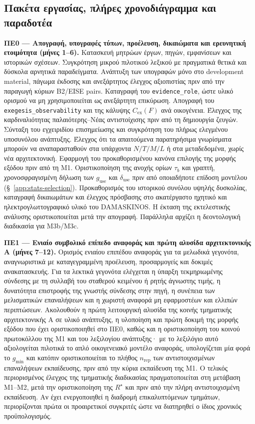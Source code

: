 \documentclass[11pt,a4paper]{article}
\begin{document}
\subsection{Πακέτα εργασίας, πλήρες χρονοδιάγραμμα και παραδοτέα}\label{app:impl-wp}

\textbf{ΠΕ0 --- Απογραφή, υπογραφές τύπων, προέλευση, δικαιώματα και ερευνητική ετοιμότητα (μήνες 1--6).} Κατασκευή μητρώων έργων, πηγών, εμφανίσεων και ιστορικών σχέσεων. Συγκρότηση μικρού πιλοτικού λεξικού με πραγματικά θετικά και δύσκολα αρνητικά παραδείγματα. Ανάπτυξη των υπογραφών μόνο στο development material, πάγωμα έκδοσης και ανεξάρτητος έλεγχος αξιοπιστίας πριν από την παραγωγή κύριων B2/EISE pairs. Καταγραφή του \texttt{evidence\_role}, ώστε υλικό ορισμού να μη χρησιμοποιείται ως ανεξάρτητη επικύρωση. Απογραφή του \texttt{exegesis\_observability} και της κάλυψης $C_{\mathrm{ex}}(F)$ ανά οικογένεια. Έλεγχος της καρδιναλιότητας παλαιότερης--Νέας αντιστοίχισης πριν από τη δημιουργία ζευγών. Σύνταξη του εγχειριδίου επισημείωσης και συγκρότηση του πλήρως ελεγμένου υποσυνόλου ανάπτυξης. Έλεγχος ότι τα απαιτούμενα παρατηρήσιμα γνωρίσματα μπορούν να αναπαρασταθούν στα υπάρχοντα $N/T/M/L$ ή στα μεταδεδομένα, χωρίς νέα αρχιτεκτονική. Εφαρμογή του προκαθορισμένου κανόνα επιλογής της μορφής εξόδου πριν από τη M1. Οριστικοποίηση της ανοχής ορίων $\tau_b$ και γραπτή, χρονοσφραγισμένη δήλωση των $g_{\mathrm{use}}$ και $\delta_{\mathrm{use}}$ πριν από οποιαδήποτε επίδοση μοντέλου (§~\ref{app:stats-selection}). Προκαθορισμός του ιστορικού συνόλου υψηλής δυσκολίας, καταγραφή δικαιωμάτων και έλεγχος πρόσβασης στο ακατέργαστο ηχητικό και ηλεκτρογλωττογραφικό υλικό του DAMASKINOS. Η έκταση της εκτελεστικής ανάλυσης οριστικοποιείται μετά την απογραφή. Παράλληλα αρχίζει η δεοντολογική διαδικασία για M3b/M3c.

\textbf{ΠΕ1 --- Ενιαίο συμβολικό επίπεδο αναφοράς και πρώτη αλυσίδα αρχιτεκτονικής A (μήνες 7--12).} Ορισμός ενιαίου επιπέδου αναφοράς για τα μελωδικά γεγονότα, αναγνωριστικά με καταγεγραμμένη προέλευση, προσαρμογείς και δοκιμές ανακατασκευής. Για τα λεκτικά γεγονότα ελέγχεται η ύπαρξη τεκμηριωμένης σύνδεσης με τη συλλαβή του σταθερού κειμένου ή ρητής άγνωστης τιμής, η δυνατότητα επιστροφής της γνωστής σύνδεσης στην πηγή, η συνέπεια των μελισματικών επαναλήψεων και η χωριστή αναφορά μη εφαρμοστέων και ελλιπών περιπτώσεων. Ακολουθούν η πρώτη λειτουργική αλυσίδα της κοινής τμηματικής αρχιτεκτονικής Α σε υλικό ανάπτυξης, η υλοποίηση και πρώτη δοκιμή της μορφής εξόδου που έχει οριστικοποιηθεί στο ΠΕ0, καθώς και η οριστικοποίηση του κοινού πρωτοκόλλου της M1 και του λεξιλογίου ανάπτυξης· με το λεξιλόγιο αυτό αξιολογείται πιλοτικά το απλό οικογενειακό μοντέλο αναφοράς, υπολογίζεται μία φορά το $g_{\min}$ και κατόπιν οριστικοποιείται το πλήθος $n_{\mathrm{rep}}$ των αντιστοιχισμένων επαναλήψεων εκπαίδευσης, πριν από την κύρια εκπαίδευση της M1. Ο τελικός περιορισμένος έλεγχος της τμηματικής διαδικασίας πραγματοποιείται στη μετάβαση M1--M2, μετά την οριστικοποίηση της $R^\star$ και πριν από την πλήρη αντιστοιχισμένη εκπαίδευση. Αν έχει ενεργοποιηθεί η διαδρομή επικαλυπτόμενων τμημάτων, περιορίζονται πρώτα οι προαιρετικοί συγκριτές ώστε να διατηρηθεί ο ίδιος χρονικός προϋπολογισμός.
\end{document}
